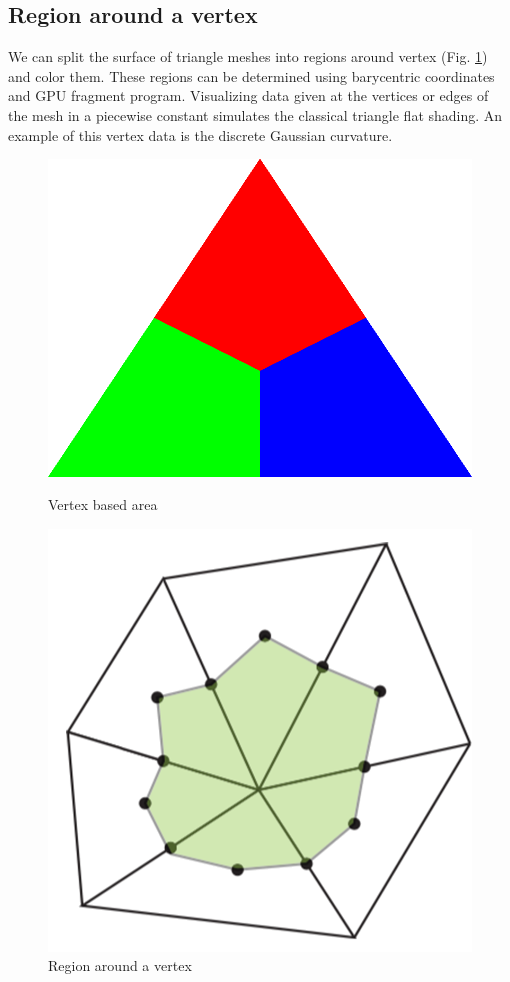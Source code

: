 \subsection{Region around a vertex}
We can split the surface of triangle meshes into regions around vertex (Fig. \ref{fig:vertex-area}) and color them.
These regions can be determined using barycentric coordinates and GPU fragment program. Visualizing data given at the vertices or edges of the mesh in a piecewise constant simulates the classical triangle flat shading.
An example of this vertex data is the discrete Gaussian curvature.
\begin{figure}[h]
    \centering
    \includegraphics[scale=0.15]{images/max.png}
    \caption{Vertex based area}\label{fig:max-diagram}
    \endminipage\hfill
    \includegraphics[scale=0.15]{images/vertex-area.png}
    \caption{Region around a vertex}\label{fig:vertex-area}
    \endminipage
\end{figure}

